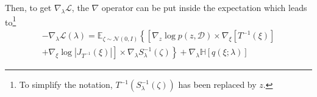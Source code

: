 \documentclass[twocolumn,twocolappendix,nofootinbib,iop]{openjournal}
\begin{document}
Then,
to get $\nabla_\lambda \mathcal{L}$, the $\nabla$ operator can be put inside the expectation which leads to\footnote{To simplify the notation, $T^{-1}(S_\lambda^{-1}(\zeta))$ has been replaced by $z$.}
\begin{multline}
-\nabla_\lambda\mathcal{L}(\lambda) = \mathbb{E}_{\zeta\sim \mathcal{N}(0,I)}\left\{
\left[ \nabla_z \log p(z,\mathcal{D}) \times \nabla_\xi[T^{-1}(\xi)] \right. \right. \\
+ \left. \left. \nabla_\xi \log|J_{T^{-1}}(\xi)| \right] \times \nabla_\lambda S_\lambda^{-1}(\zeta)
\right\}
+ \nabla_\lambda \mathbb{H}[q(\xi;\lambda)]
\label{eq-loss-svi-4}
\end{multline}
\end{document}
